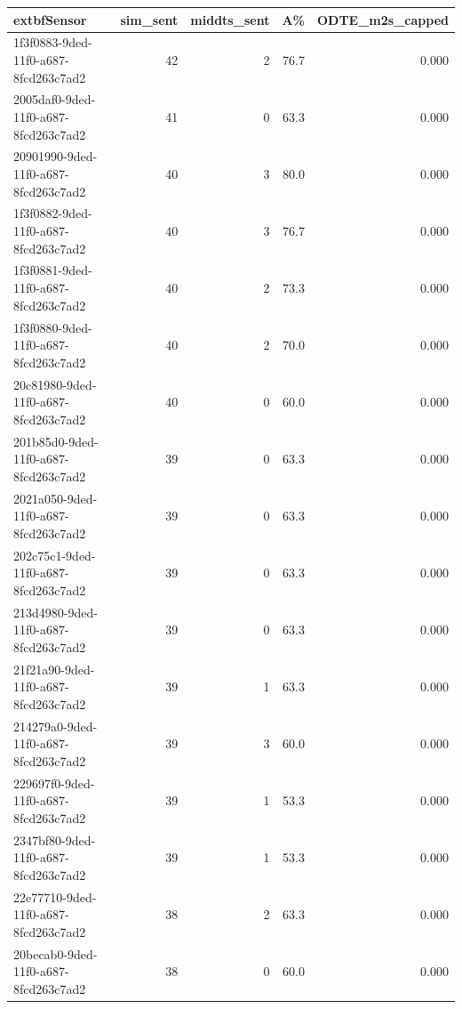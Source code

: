 \begin{longtable}{l r r r r}
	extbf{Sensor} & \textbf{sim_sent} & \textbf{middts_sent} & \textbf{A\%} & \textbf{ODTE\_m2s\_capped} \\
\hline

1f3f0883-9ded-11f0-a687-8fcd263c7ad2 & 42 & 2 & 76.7 & 0.000 \\

2005daf0-9ded-11f0-a687-8fcd263c7ad2 & 41 & 0 & 63.3 & 0.000 \\

20901990-9ded-11f0-a687-8fcd263c7ad2 & 40 & 3 & 80.0 & 0.000 \\

1f3f0882-9ded-11f0-a687-8fcd263c7ad2 & 40 & 3 & 76.7 & 0.000 \\

1f3f0881-9ded-11f0-a687-8fcd263c7ad2 & 40 & 2 & 73.3 & 0.000 \\

1f3f0880-9ded-11f0-a687-8fcd263c7ad2 & 40 & 2 & 70.0 & 0.000 \\

20c81980-9ded-11f0-a687-8fcd263c7ad2 & 40 & 0 & 60.0 & 0.000 \\

201b85d0-9ded-11f0-a687-8fcd263c7ad2 & 39 & 0 & 63.3 & 0.000 \\

2021a050-9ded-11f0-a687-8fcd263c7ad2 & 39 & 0 & 63.3 & 0.000 \\

202c75c1-9ded-11f0-a687-8fcd263c7ad2 & 39 & 0 & 63.3 & 0.000 \\

213d4980-9ded-11f0-a687-8fcd263c7ad2 & 39 & 0 & 63.3 & 0.000 \\

21f21a90-9ded-11f0-a687-8fcd263c7ad2 & 39 & 1 & 63.3 & 0.000 \\

214279a0-9ded-11f0-a687-8fcd263c7ad2 & 39 & 3 & 60.0 & 0.000 \\

229697f0-9ded-11f0-a687-8fcd263c7ad2 & 39 & 1 & 53.3 & 0.000 \\

2347bf80-9ded-11f0-a687-8fcd263c7ad2 & 39 & 1 & 53.3 & 0.000 \\

22e77710-9ded-11f0-a687-8fcd263c7ad2 & 38 & 2 & 63.3 & 0.000 \\

20becab0-9ded-11f0-a687-8fcd263c7ad2 & 38 & 0 & 60.0 & 0.000 \\


\end{longtable}
